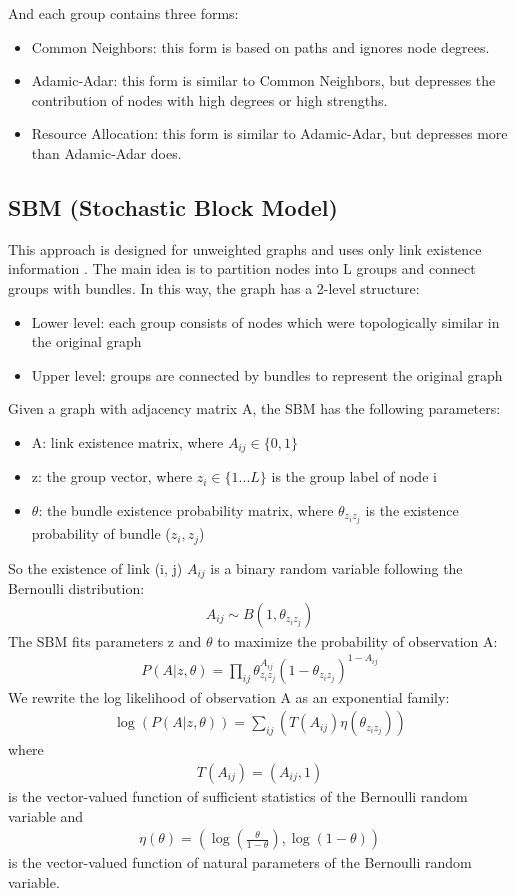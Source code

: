 \documentclass[12pt]{WSUThesis}
\theoremstyle{definition}
\begin{document}
And each group contains three forms:
\begin{itemize}
	\item Common Neighbors: this form is based on paths and ignores node degrees.
	\item Adamic-Adar: this form is similar to Common Neighbors,
	but depresses the contribution of nodes with high degrees or high strengths.
	\item Resource Allocation: this form is similar to Adamic-Adar,
	but depresses more than Adamic-Adar does.
\end{itemize}

\subsection{SBM (Stochastic Block Model)}
This approach is designed for unweighted graphs and uses only link existence information \cite{holland1983stochastic}.
The main idea is to partition nodes into L groups and connect groups with bundles.
In this way, the graph has a 2-level structure:
\begin{itemize}
	\item Lower level: each group consists of nodes which were topologically similar in the original graph
	\item Upper level: groups are connected by bundles
	to represent the original graph
\end{itemize}
Given a graph with adjacency matrix A, the SBM has the following parameters:
\begin{itemize}
	\item A: link existence matrix, where $ A_{ij} \in \{0, 1\} $
	\item z: the group vector,
	where $ z_i \in \{ 1 ... L \} $ is the group label of node i
	\item $ \theta $: the bundle existence probability matrix,
	where $ \theta_{z_i z_j} $ is the existence probability of bundle ($z_i, z_j$)
\end{itemize}
So the existence of link (i, j) $ A_{ij} $ is a binary random variable following the Bernoulli distribution:
\begin{align*}
A_{ij} \sim B(1, \theta_{z_i z_j})
\end{align*}
The SBM fits parameters z and $ \theta $
to maximize the probability of observation A:
\begin{align*}
P(A|z, \theta) 
= \prod_{ij} \theta_{z_i z_j}^{A_{ij}}(1-\theta_{z_i z_j})^{1-A_{ij}}
\end{align*}
We rewrite the log likelihood of observation A as an exponential family:
\begin{align*}
\log(P(A|z, \theta))
= \sum_{ij} (
T(A_{ij}) \eta(\theta_{z_i z_j})
)
\end{align*}
where
\begin{align*}
T(A_{ij}) = (A_{ij}, 1)
\end{align*}
is the vector-valued function of sufficient statistics of the Bernoulli random variable and
\begin{align*}
\eta(\theta) = ( \log(\frac{\theta}{1-\theta}), \log(1-\theta) )
\end{align*}
is the vector-valued function of natural parameters of the Bernoulli random variable.
\end{document}
